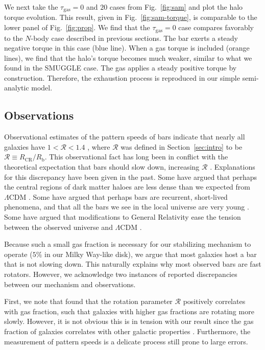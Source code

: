 \documentclass[twocolumn,linenumbers]{aastex631}
\newcommand{\RCR}{\ensuremath{R_{\textrm{CR}}}}
\newcommand{\Rot}{\ensuremath{\mathcal{R}}}
\newcommand{\Rb}{\ensuremath{R_{\textrm{b}}}}
\newcommand{\Nbody}{$N$-body}
\newcommand{\SMUGGLE}{SMUGGLE}
\begin{document}
We next take the $\tau_{\textrm{gas}}=0$ and $20$ cases from Fig.~\ref{fig:sam}
and plot the halo torque evolution. This result, given in Fig.~\ref{fig:sam-torque},
is comparable to the lower panel of Fig.~\ref{fig:prop}. We find that the
$\tau_{\textrm{gas}}=0$ case compares favorably to the \Nbody{} case described
in previous sections. The bar exerts a steady negative torque in this case (blue
line). When a gas torque is included (orange lines), we find that the halo's
torque becomes much weaker, similar to what we found in the \SMUGGLE{} case. The
gas applies a steady positive torque by construction. Therefore, the exhaustion
process is reproduced in our simple semi-analytic model.

\subsection{Observations}
Observational estimates of the pattern speeds of bars indicate that nearly all
galaxies have $1 < \Rot < 1.4$ \citep{2011MSAIS..18...23C, 2015AA...576A.102A,
2019MNRAS.482.1733G, 2020MNRAS.491.3655G}, where $\Rot$ was defined in
Section~\ref{sec:intro} to be $\Rot\equiv \RCR/\Rb$. This observational fact has
long been in conflict with the theoretical expectation that bars should slow
down, increasing \Rot{} \citep[e.g.][]{1984MNRAS.209..729T, 1985MNRAS.213..451W,
2000ApJ...543..704D}. Explanations for this discrepancy have been given in the
past. Some have argued that perhaps the central regions of dark matter haloes
are less dense than we expected from $\Lambda\textrm{CDM}$
\citep[e.g.][]{2000ApJ...543..704D,2021AA...650L..16F}. Some have argued that
perhaps bars are recurrent, short-lived phenomena, and that all the bars we see
in the local universe are very young \citep{2002AA...392...83B,
2005MNRAS.364L..18B}. Some have argued that modifications to General Relativity
ease the tension between the observed universe and $\Lambda\textrm{CDM}$
\citep[e.g.][]{2021MNRAS.503.2833R, 2021MNRAS.508..926R}.

Because such a small gas fraction is necessary for our stabilizing mechanism to
operate ($5\%$ in our Milky Way-like disk), we argue that most galaxies host a
bar that is not slowing down. This naturally explains why most observed bars are
fast rotators. However, we acknowledge two instances of reported discrepancies
between our mechanism and observations.

First, we note that \citet{2020MNRAS.491.3655G} found that the rotation
parameter \Rot{} positively correlates with gas fraction, such that galaxies
with higher gas fractions are rotating more slowly. However, it is not obvious
this is in tension with our result since the gas fraction of galaxies correlates
with other galactic properties \citep{2009ARAA..47..159B}. Furthermore, the
measurement of pattern speeds is a delicate process still prone to large errors.
\end{document}
